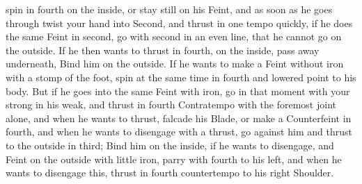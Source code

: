 \newpage


\newpage


spin in fourth on the inside, or stay still on his Feint, and as
soon as he goes through twist your hand into Second, and thrust in one
tempo quickly, if he does the same Feint in second, go with second in
an even line, that he cannot go on the outside. If he then wants to
thrust in fourth, on the inside, pass away underneath, Bind him on the
outside. If he wants to make a Feint without iron with a stomp of the
foot, spin at the same time in fourth and lowered point to his
body. But if he goes into the same Feint with iron, go in that moment
with your strong in his weak, and thrust in fourth Contratempo with
the foremost joint alone, and when he wants to thrust,
falcade
his Blade, or make a Counterfeint in fourth, and when he wants to
disengage with a thrust, go against him and thrust to the outside in
third; Bind him on the inside, if he wants to disengage, and Feint on
the outside with little iron, parry with fourth to his left, and when
he wants to disengage this, thrust in fourth countertempo to his right
Shoulder.


